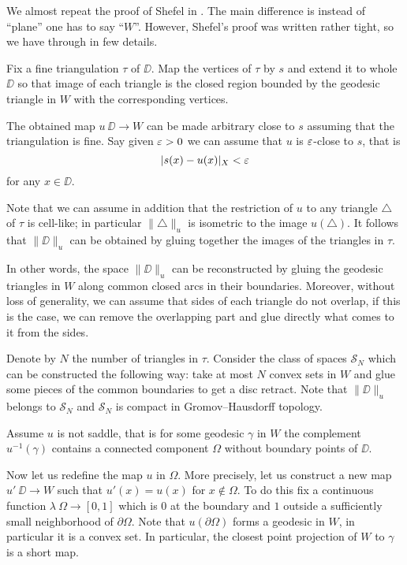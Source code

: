\documentclass[a4paper,10pt]{amsart}
\begin{document}
We almost repeat the proof of Shefel in \cite{shefel-2D}.
The main difference is instead of ``plane'' one has to say ``$W$''.
However, Shefel's proof was written rather tight, so we have through in few details.

Fix a fine triangulation $\tau$ of $\DD$.
Map the vertices of $\tau$ by $s$
and extend it to whole $\DD$ so that image of each triangle 
is the closed region bounded by the geodesic triangle in $W$ with the corresponding vertices.

The obtained map $u\:\DD\to W$ can be made arbitrary close to $s$ assuming that the triangulation is fine.
Say given $\varepsilon>0$ we can assume that $u$ is $\varepsilon$-close to $s$,
that is 
\[|s(x)-u(x)|_X<\varepsilon\]
for any $x\in\DD$.

Note that we can assume in addition that the restriction of $u$ to any triangle  $\triangle$ of $\tau$ is cell-like;
in particular $\|\triangle\|_u$ is isometric to the image $u(\triangle)$.
It follows that $\|\DD\|_u$ can be obtained by gluing together the images of the triangles in $\tau$.

In other words, the space $\|\DD\|_u$ can be reconstructed by gluing the geodesic triangles in $W$ along common closed arcs in their boundaries.
Moreover, without loss of generality, %
we can assume that sides of each triangle do not overlap, 
if this is the case, we can remove the overlapping part and glue directly what comes to it from the sides.%

Denote by $N$ the number of triangles in $\tau$.
Consider the class of spaces $\mathcal{S}_N$ which can be constructed the following way:
take at most $N$ convex sets in $W$ and glue some pieces of the common boundaries to get a disc retract.
Note that $\|\DD\|_u$ belongs to $\mathcal{S}_N$ and $\mathcal{S}_N$ is compact in Gromov--Hausdorff topology.


Assume $u$ is not saddle,
that is for some geodesic $\gamma$ in $W$
the complement $u^{-1}(\gamma)$ contains a connected component $\Omega$ without boundary points of $\DD$.

Now let us redefine the map $u$ in $\Omega$.
More precisely, let us construct a new map $u'\:\DD\to W$
such that $u'(x)=u(x)$ for $x\notin\Omega$.
To do this fix a continuous function $\lambda\:\Omega\to [0,1]$
which is $0$ at the boundary and $1$ outside a sufficiently small neighborhood of $\partial \Omega$.
Note that $u(\partial\Omega)$ forms a geodesic in $W$,
in particular it is a convex set.
In particular, the closest point projection of $W$ to $\gamma$ is a short map.
\end{document}
